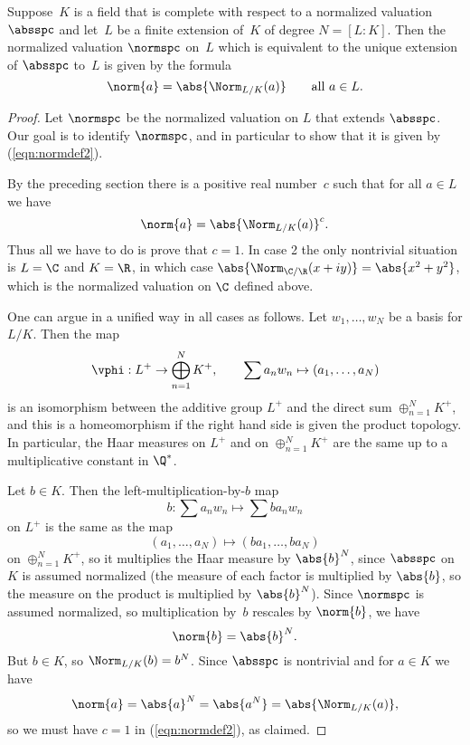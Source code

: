 \begin{lemma}
  Suppose~$K$ is a field that is complete with respect to a normalized
  valuation~$\absspc$ and let~$L$ be a finite extension of~$K$ of
  degree $N=[L:K]$.  Then the normalized valuation $\normspc$ on~$L$
  which is equivalent to the unique extension of $\absspc$ to~$L$ is
  given by the formula
\begin{equation}\label{eqn:normdef2}
 \norm{a} = \abs{\Norm_{L/K}(a)}\qquad \text{all } a\in L.
\end{equation}
\end{lemma}
\begin{proof}
Let $\normspc$ be the normalized valuation on $L$ that extends $\absspc$.
Our goal is to identify $\normspc$, and in particular to show
that it is given by (\ref{eqn:normdef2}).

By the preceding section there is a positive real number~$c$ 
such that for all $a\in L$ we have
$$\norm{a} = \abs{\Norm_{L/K}(a)}^c.$$
Thus all we have to do is prove that $c=1$.
In case 2 the only nontrivial situation is $L=\C$ and $K=\R$,
in which case $\abs{\Norm_{\C/\R}(x+iy)} = \abs{x^2+y^2}$,
which is the normalized valuation on $\C$ defined above.

One can argue in a unified way in all cases as follows.
Let $w_1,\ldots, w_N$ be a basis for $L/K$. Then the map
$$
  \vphi:L^+ \to \bigoplus_{n=1}^N K^+, \qquad 
\sum a_n w_n \mapsto (a_1,\ldots, a_N)
$$
is an isomorphism between the additive group $L^+$
and the direct sum $\oplus_{n=1}^N K^+$, and
this is a homeomorphism if the right hand side
is given the product topology.  In particular, the
Haar measures on $L^+$ and on $\oplus_{n=1}^N K^+$
are the same up to a multiplicative constant in $\Q^*$.  

Let $b\in K$.  Then the left-multiplication-by-$b$ map
$$
   b : \sum a_n w_n \mapsto \sum b a_n w_n
$$
on $L^+$ is the same as the map
$$
  (a_1,\ldots, a_N) \mapsto (ba_1,\ldots, ba_N)
$$
on $\oplus_{n=1}^N K^+$, so it multiplies the Haar
measure by $\abs{b}^N$, since $\absspc$ on~$K$
is assumed normalized (the measure of each factor
is multiplied by $\abs{b}$, so the measure on
the product is multiplied by $\abs{b}^N$).
Since $\normspc$ is assumed normalized, so
multiplication by~$b$ rescales by $\norm{b}$, we
have 
$$
  \norm{b} = \abs{b}^N.
$$
But $b\in K$, so $\Norm_{L/K}(b) = b^N$.
Since $\absspc$ is nontrivial and for $a\in K$ we 
have $$\norm{a} = \abs{a}^N = \abs{a^N} = \abs{\Norm_{L/K}(a)},$$
so we must have $c=1$ in (\ref{eqn:normdef2}), as claimed.
\end{proof}

